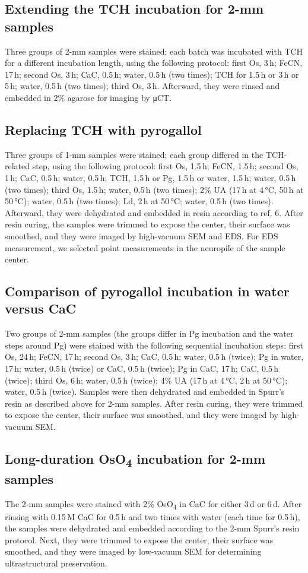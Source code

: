 \documentclass{article}
\begin{document}
\subsection*{Extending the TCH incubation for 2-mm samples}
Three groups of 2-mm samples were stained; each batch was incubated with TCH for a different incubation length, using the following protocol: first Os, 3\,h; FeCN, 17\,h; second Os, 3\,h; CaC, 0.5\,h; water, 0.5\,h (two times); TCH for 1.5\,h or 3\,h or 5\,h; water, 0.5\,h (two times); third Os, 3\,h. Afterward, they were rinsed and embedded in 2\% agarose for imaging by μCT.

\subsection*{Replacing TCH with pyrogallol}
Three groups of 1-mm samples were stained; each group differed in the TCH-related step, using the following protocol: first Os, 1.5\,h; FeCN, 1.5\,h; second Os, 1\,h; CaC, 0.5\,h; water, 0.5\,h; TCH, 1.5\,h or Pg, 1.5\,h or water, 1.5\,h; water, 0.5\,h (two times); third Os, 1.5\,h; water, 0.5\,h (two times); 2\% UA (17\,h at 4\,°C, 50\,h at 50\,°C); water, 0.5\,h (two times); Ld, 2\,h at 50\,°C; water, 0.5\,h (two times). Afterward, they were dehydrated and embedded in resin according to ref. 6. After resin curing, the samples were trimmed to expose the center, their surface was smoothed, and they were imaged by high-vacuum SEM and EDS. For EDS measurement, we selected point measurements in the neuropile of the sample center.

\subsection*{Comparison of pyrogallol incubation in water versus CaC}
Two groups of 2-mm samples (the groups differ in Pg incubation and the water steps around Pg) were stained with the following sequential incubation steps: first Os, 24\,h; FeCN, 17\,h; second Os, 3\,h; CaC, 0.5\,h; water, 0.5\,h (twice); Pg in water, 17\,h; water, 0.5\,h (twice) or CaC, 0.5\,h (twice); Pg in CaC, 17\,h; CaC, 0.5\,h (twice); third Os, 6\,h; water, 0.5\,h (twice); 4\% UA (17\,h at 4\,°C, 2\,h at 50\,°C); water, 0.5\,h (twice). Samples were then dehydrated and embedded in Spurr’s resin as described above for 2-mm samples. After resin curing, they were trimmed to expose the center, their surface was smoothed, and they were imaged by high-vacuum SEM.

\subsection*{Long-duration OsO\textsubscript{4} incubation for 2-mm samples}
The 2-mm samples were stained with 2\% OsO\textsubscript{4} in CaC for either 3\,d or 6\,d. After rinsing with 0.15\,M CaC for 0.5\,h and two times with water (each time for 0.5\,h), the samples were dehydrated and embedded according to the 2-mm Spurr’s resin protocol. Next, they were trimmed to expose the center, their surface was smoothed, and they were imaged by low-vacuum SEM for determining ultrastructural preservation.
\end{document}

